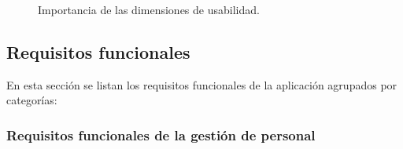 \begin{figure}
\centering
{}
\caption{Importancia de las dimensiones de usabilidad.}
\label{fig:usabilidad}
\end{figure}

\subsection{Requisitos funcionales}
\label{sec:requisitos_funcionales}

En esta sección se listan los requisitos funcionales de la aplicación agrupados
por categorías:

\subsubsection{Requisitos funcionales de la gestión de personal}
\label{sec:requisitos_personal}

